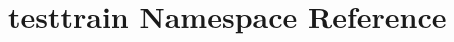 \hypertarget{namespacetesttrain}{\section{testtrain Namespace Reference}
\label{namespacetesttrain}
}
